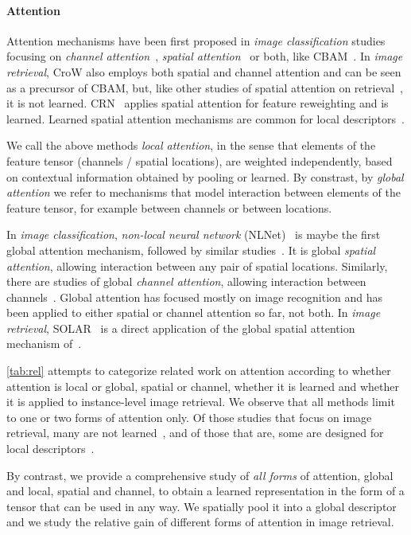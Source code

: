 \paragraph{Attention}

Attention mechanisms have been first proposed in \emph{image classification} studies focusing on \emph{channel attention}~\cite{Hu01, wang01, Cao01}, \emph{spatial attention}~\cite{HuSASV18} or both, like CBAM~\cite{woo01}. In \emph{image retrieval}, CroW \cite{Kalantidis01} also  employs both spatial and channel attention and can be seen as a precursor of CBAM, but, like other studies of spatial attention on retrieval~\cite{simeoni2019graph, JimenezAN17, gu2018attention}, it is not learned. CRN~\cite{Kim01} applies spatial attention for feature reweighting and is learned. Learned spatial attention mechanisms are common for local descriptors~\cite{Noh01, ECCV2020_912, tolias2020learning}.

We call the above methods \emph{local attention}, in the sense that elements of the feature tensor (channels / spatial locations), are weighted independently, based on contextual information obtained by pooling or learned. By constrast, by \emph{global attention} we refer to mechanisms that model interaction between elements of the feature tensor, for example between channels or between locations.

In \emph{image classification}, \emph{non-local neural network} (NLNet)~\cite{Wang02} is maybe the first global attention mechanism, followed by similar studies~\cite{Bello_2019_ICCV,zhao2020exploring,plotz2018neural}. It is global \emph{spatial attention}, allowing interaction between any pair of spatial locations. Similarly, there are studies of global \emph{channel attention}, allowing interaction between channels~\cite{ChenKLYF18, Gao_2019_CVPR}. Global attention has focused mostly on image recognition and has been applied to either spatial or channel attention so far, not both. In \emph{image retrieval}, SOLAR~\cite{Ng01} is a direct application of the global spatial attention mechanism of~\cite{Wang02}.

\autoref{tab:rel} attempts to categorize related work on attention according to whether attention is local or global, spatial or channel, whether it is learned and whether it is applied to instance-level image retrieval. We observe that all methods limit to one or two forms of attention only. Of those studies that focus on image retrieval, many are not learned~\cite{JimenezAN17, gu2018attention, Kalantidis01}, and of those that are, some are designed for local descriptors~\cite{Noh01,tolias2020learning}.

By contrast, we provide a comprehensive study of \emph{all forms} of attention, global and local, spatial and channel, to obtain a learned representation in the form of a tensor that can be used in any way. We spatially pool it into a global descriptor and we study the relative gain of different forms of attention in image retrieval.
